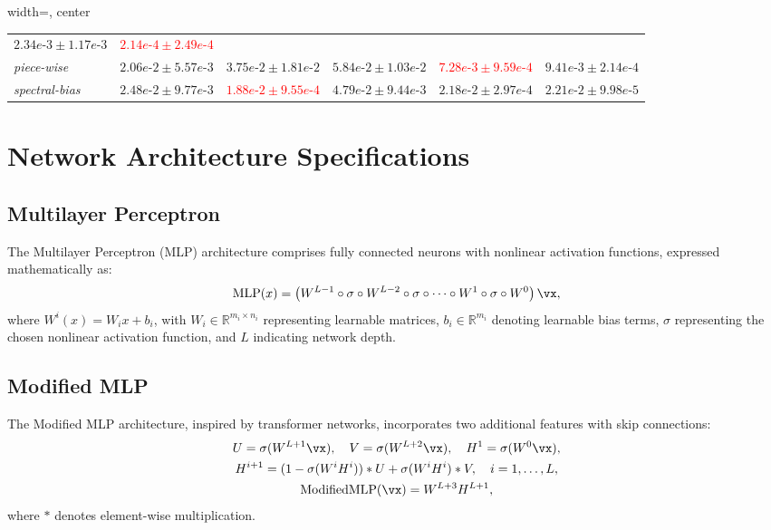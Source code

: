 \begin{table}[ht]
\begin{center}
\begin{adjustbox}{width=\columnwidth, center}
\begin{tabular}{llllll}
$2.34e\mbox{-}3 \pm 1.17e\mbox{-}3$ &
\textcolor{red}{$2.14e\mbox{-}4 \pm 2.49 e\mbox{-}4$} \\ 
\textit{piece-wise} & $2.06e\mbox{-}2 \pm 5.57e\mbox{-}3$ & $3.75e\mbox{-}2 \pm 1.81e\mbox{-}2$ & $5.84e\mbox{-}2 \pm 1.03e\mbox{-}2$ &
\textcolor{red}{$7.28e\mbox{-}3 \pm 9.59 e\mbox{-}4$} &
$9.41e\mbox{-}3 \pm 2.14e\mbox{-}4$ \\ 
\textit{spectral-bias} & $2.48e\mbox{-}2 \pm 9.77 e\mbox{-}3$ & \textcolor{red}{$1.88e\mbox{-}2 \pm 9.55e\mbox{-}4$} & $4.79e\mbox{-}2 \pm 9.44 e\mbox{-}3$ &
$2.18e\mbox{-}2 \pm 2.97 e\mbox{-}4$ &
$2.21e\mbox{-}2 \pm 9.98 e\mbox{-}5$ \\ 
\end{tabular}
\end{adjustbox}
\end{center}
\end{table}

\section{Network Architecture Specifications}\label{Appendix: networks}
\subsection{Multilayer Perceptron}
The Multilayer Perceptron (MLP) architecture comprises fully connected neurons with nonlinear activation functions, expressed mathematically as:
\begin{equation}
\operatorname{MLP}(x)=\left(W^{L-1} \circ \sigma \circ W^{L-2} \circ \sigma \circ \cdots \circ W^1 \circ \sigma \circ W^0\right) \vx,
\end{equation}
where $W^i(x)=W_ix+b_i$, with $W_i \in \mathbb{R}^{m_i \times n_i}$ representing learnable matrices, $b_i \in \mathbb{R}^{m_i}$ denoting learnable bias terms, $\sigma$ representing the chosen nonlinear activation function, and $L$ indicating network depth.

\subsection{Modified MLP}
The Modified MLP architecture, inspired by transformer networks, incorporates two additional features with skip connections:
\begin{equation}
\begin{gathered}
    U=\sigma(W^{L+1}\vx), \quad V=\sigma(W^{L+2}\vx), \quad H^1=\sigma(W^{0}\vx), \\
    H^{i+1} = (1-\sigma(W^{i}H^{i}))*U+\sigma(W^{i}H^{i})*V, \quad i=1,\dots,L, \\
    \operatorname{Modified MLP}(\vx) = W^{L+3}H^{L+1},
\end{gathered}
\end{equation}
where $*$ denotes element-wise multiplication.

